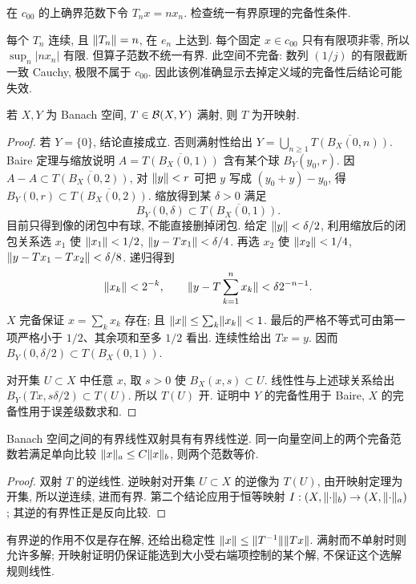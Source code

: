 \begin{example}\label{legacy:ch04:example1}
在 $c_{00}$ 的上确界范数下令 $T_nx=nx_n$. 检查统一有界原理的完备性条件.
\end{example}
\begin{solution}
每个 $T_n$ 连续, 且 $\lVert T_n\rVert=n$, 在 $e_n$ 上达到. 每个固定 $x\in c_{00}$ 只有有限项非零, 所以 $\sup_n|nx_n|$ 有限. 但算子范数不统一有界. 此空间不完备: 数列 $(1/j)$ 的有限截断一致 Cauchy, 极限不属于 $c_{00}$. 因此该例准确显示去掉定义域的完备性后结论可能失效.
\end{solution}

\begin{theorem}[开映射定理]\label{thm:open}
若 $X,Y$ 为 Banach 空间, $T\in\mathcal B(X,Y)$ 满射, 则 $T$ 为开映射.
\end{theorem}
\begin{proof}
若 $Y=\{0\}$, 结论直接成立. 否则满射性给出 $Y=\bigcup_{n\ge1}\overline{T(B_X(0,n))}$. Baire 定理与缩放说明 $A=\overline{T(B_X(0,1))}$ 含有某个球 $B_Y(y_0,r)$. 因 $A-A\subset\overline{T(B_X(0,2))}$, 对 $\lVert y\rVert<r$ 可把 $y$ 写成 $(y_0+y)-y_0$, 得 $B_Y(0,r)\subset\overline{T(B_X(0,2))}$. 缩放得到某 $\delta>0$ 满足
\[
B_Y(0,\delta)\subset\overline{T(B_X(0,1))}.
\]
目前只得到像的闭包中有球, 不能直接删掉闭包. 给定 $\lVert y\rVert<\delta/2$, 利用缩放后的闭包关系选 $x_1$ 使 $\lVert x_1\rVert<1/2$, $\lVert y-Tx_1\rVert<\delta/4$. 再选 $x_2$ 使 $\lVert x_2\rVert<1/4$, $\lVert y-Tx_1-Tx_2\rVert<\delta/8$. 递归得到
\[
\lVert x_k\rVert<2^{-k},\qquad
\lVert y-T\sum_{k=1}^n x_k\rVert<\delta2^{-n-1}.
\]
$X$ 完备保证 $x=\sum_kx_k$ 存在; 且 $\lVert x\rVert\le\sum_k\lVert x_k\rVert<1$. 最后的严格不等式可由第一项严格小于 $1/2$、其余项和至多 $1/2$ 看出. 连续性给出 $Tx=y$. 因而 $B_Y(0,\delta/2)\subset T(B_X(0,1))$.

对开集 $U\subset X$ 中任意 $x$, 取 $s>0$ 使 $B_X(x,s)\subset U$. 线性性与上述球关系给出 $B_Y(Tx,s\delta/2)\subset T(U)$. 所以 $T(U)$ 开. 证明中 $Y$ 的完备性用于 Baire, $X$ 的完备性用于误差级数求和.
\end{proof}

\begin{corollary}[有界逆定理]\label{cor:inverse}
Banach 空间之间的有界线性双射具有有界线性逆. 同一向量空间上的两个完备范数若满足单向比较 $\lVert x\rVert_a\le C\lVert x\rVert_b$, 则两个范数等价.
\end{corollary}
\begin{proof}
双射 $T$ 的逆线性. 逆映射对开集 $U\subset X$ 的逆像为 $T(U)$, 由开映射定理为开集, 所以逆连续, 进而有界. 第二个结论应用于恒等映射 $I:(X,\lVert \cdot\rVert_b)\to(X,\lVert \cdot\rVert_a)$; 其逆的有界性正是反向比较.
\end{proof}
有界逆的作用不仅是存在解, 还给出稳定性 $\lVert x\rVert\le\lVert T^{-1}\rVert\lVert Tx\rVert$. 满射而不单射时则允许多解; 开映射证明仍保证能选到大小受右端项控制的某个解, 不保证这个选解规则线性.

